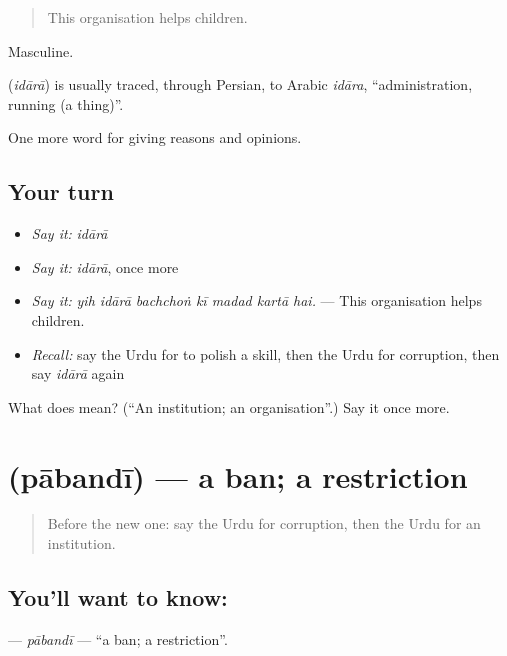 \begin{quote}
This organisation helps children.
\end{quote}

Masculine.

\begin{cousinweb}
\textbf{} (\emph{idārā}) is usually traced, through Persian, to Arabic \emph{idāra}, \textquotedblleft{}administration, running (a thing)\textquotedblright{}.
\end{cousinweb}

\begin{grammarlens}[title={What you've built}]
One more word for giving reasons and opinions.
\end{grammarlens}

\subsection*{Your turn}
\begin{itemize}
\raggedright
  \item \emph{Say it:} \emph{idārā}
  \item \emph{Say it:} \emph{idārā}, once more
  \item \emph{Say it:} \emph{yih idārā bachchoṅ kī madad kartā hai.} — This organisation helps children.
  \item \emph{Recall:} say the Urdu for to polish a skill, then the Urdu for corruption, then say \emph{idārā} again
\end{itemize}

\begin{tcolorbox}[breakable,colback=teal!4,colframe=teal!35!black,title={Before you move on}]
What does  mean? (\textquotedblleft{}An institution; an organisation\textquotedblright{}.) Say it once more.
\end{tcolorbox}
\section[\texorpdfstring{\ur{پابندی} (pābandī)}{پابندی (pābandī)}]{ (pābandī) — a ban; a restriction}

\label{lesson:UR-C357-pabandi}



\begin{quote}
Before the new one: say the Urdu for corruption, then the Urdu for an institution.
\end{quote}

\subsection*{You'll want to know: }
\textbf{} — \emph{pābandī} — \textquotedblleft{}a ban; a restriction\textquotedblright{}.

